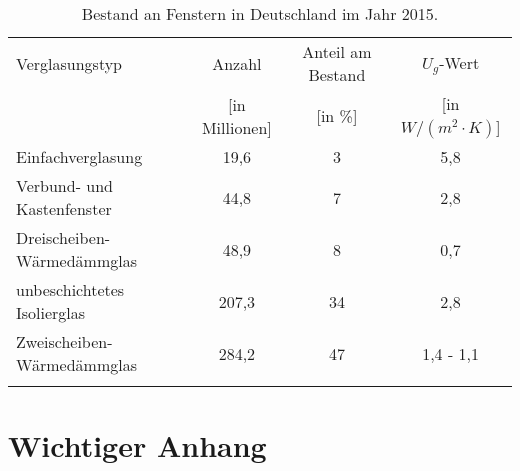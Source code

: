 \begin{table}[H]\centering
\begin{tabular}{lccc}
\toprule[1.5pt]
Verglasungstyp & Anzahl & Anteil am Bestand & \(U_g\)-Wert \\
 & [in Millionen] & [in \%] & [in \(W/(m^2 \cdot K)\)] \\ \addlinespace[5pt]
\midrule[2pt]
Einfachverglasung & 19,6 & 3 & 5,8 \\
\midrule
Verbund- und Kastenfenster & 44,8 & 7 & 2,8 \\
\midrule
Dreischeiben-Wärmedämmglas & 48,9 & 8 & 0,7 \\
\midrule
unbeschichtetes Isolierglas & 207,3 & 34 & 2,8 \\
\midrule
Zweischeiben-Wärmedämmglas & 284,2 & 47 & 1,4 - 1,1 \\
\bottomrule[1.5pt] \addlinespace[10pt]
\end{tabular}
\caption{Bestand an Fenstern in Deutschland im Jahr 2015. \cite{Bigalke.2016}}
\label{tab: TabelleA2}
\end{table}

\chapter{Wichtiger Anhang}
